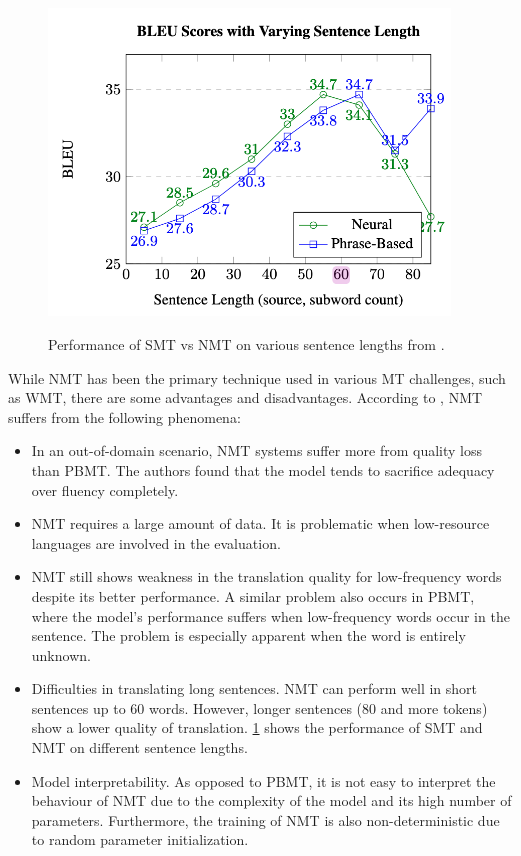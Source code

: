 \begin{figure}[h]
    {\includegraphics[width=0.95\textwidth]{img/bleusentencelength.png}}
    \centering
    \caption{Performance of SMT vs NMT on various sentence lengths from .}
    \label{img:bleusentlength}
\end{figure}


While NMT has been the primary technique used in various MT challenges, such as WMT, there are some advantages and disadvantages. According to , NMT suffers from the following phenomena:
\begin{itemize}
    \item In an out-of-domain scenario, NMT systems suffer more from quality loss than PBMT. The authors found that the model tends to sacrifice adequacy over fluency completely.

    \item NMT requires a large amount of data. It is problematic when low-resource languages are involved in the evaluation.

    \item NMT still shows weakness in the translation quality for low-frequency words despite its better performance. A similar problem also occurs in PBMT, where the model's performance suffers when low-frequency words occur in the sentence. The problem is especially apparent when the word is entirely unknown.

    \item Difficulties in translating long sentences. NMT can perform well in short sentences up to 60 words. However, longer sentences (80 and more tokens) show a lower quality of translation. \cref{img:bleusentlength} shows the performance of SMT and NMT on different sentence lengths.

    \item Model interpretability. As opposed to PBMT, it is not easy to interpret the behaviour of NMT due to the complexity of the model and its high number of parameters. Furthermore, the training of NMT is also non-deterministic due to random parameter initialization.
\end{itemize}

